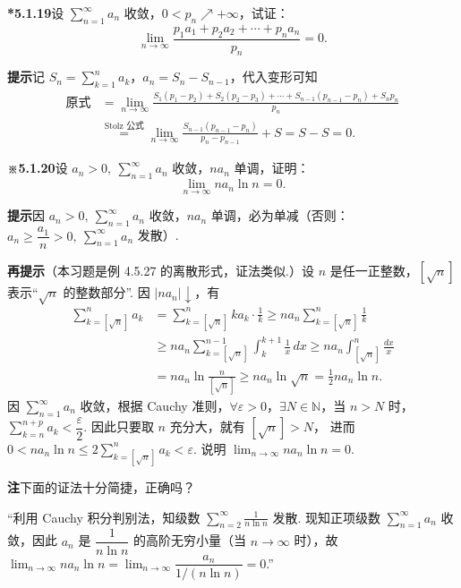 \documentclass[UTF8, 12pt, fontset=fandol, oneside]{ctexart}
\begin{document}
\noindent\textbf{*5.1.19}\quad 设 $\displaystyle\sum_{n=1}^{\infty}a_n$ 收敛，$0<p_n\nearrow+\infty$，试证：
\[
  \lim_{n\to\infty}\frac{p_1a_1+p_2a_2+\cdots+p_na_n}{p_n}=0.
\]

\noindent\textbf{提示}\quad 记 $S_n=\displaystyle\sum_{k=1}^n a_k$，$a_n=S_n-S_{n-1}$，代入变形可知
\[
\begin{aligned}
\text{原式}
&=\lim_{n\to\infty}
\frac{S_1(p_1-p_2)+S_2(p_2-p_3)+\cdots+S_{n-1}(p_{n-1}-p_n)+S_np_n}{p_n}\\
&\stackrel{\text{Stolz 公式}}{=}
\lim_{n\to\infty}\frac{S_{n-1}(p_{n-1}-p_n)}{p_n-p_{n-1}}+S
=S-S=0.
\end{aligned}
\]

\noindent\textbf{※5.1.20}\quad 设 $a_n>0,\ \displaystyle\sum_{n=1}^{\infty}a_n$ 收敛，$na_n$ 单调，证明：
\[
  \lim_{n\to\infty}na_n\ln n=0.
\]

\noindent\textbf{提示}\quad 因 $a_n>0,\ \sum_{n=1}^{\infty}a_n$ 收敛，$na_n$ 单调，必为单减（否则：
$a_n\ge\dfrac{a_1}{n}>0,\ \sum_{n=1}^{\infty}a_n$ 发散）.

\noindent\textbf{再提示}\quad （本习题是例 4.5.27 的离散形式，证法类似.）设 $n$ 是任一正整数，$[\sqrt n]$ 表示“$\sqrt n$ 的整数部分”. 因 $|na_n|\downarrow$，有
\[
\begin{aligned}
\sum_{k=[\sqrt n]}^n a_k
&=\sum_{k=[\sqrt n]}^n ka_k\cdot\frac1k
\ge na_n\sum_{k=[\sqrt n]}^n\frac1k\\
&\ge na_n\sum_{k=[\sqrt n]}^{n-1}\int_k^{k+1}\frac1x\,dx
\ge na_n\int_{[\sqrt n]}^n\frac{dx}{x}\\
&=na_n\ln\frac{n}{[\sqrt n]}
\ge na_n\ln\sqrt n=\frac12na_n\ln n.
\end{aligned}
\]
因 $\sum_{n=1}^{\infty}a_n$ 收敛，根据 Cauchy 准则，$\forall\varepsilon>0$，$\exists N\in\mathbb N$，当 $n>N$ 时，
$\displaystyle\sum_{k=n}^{n+p}a_k<\dfrac{\varepsilon}{2}$. 因此只要取 $n$ 充分大，就有 $[\sqrt n]>N$，
进而 $0<na_n\ln n\le2\displaystyle\sum_{k=[\sqrt n]}^na_k<\varepsilon$. 说明
$\lim_{n\to\infty}na_n\ln n=0$.

\noindent\textbf{注}\quad 下面的证法十分简捷，正确吗？

“利用 Cauchy 积分判别法，知级数
$\displaystyle\sum_{n=2}^{\infty}\frac1{n\ln n}$ 发散. 现知正项级数
$\displaystyle\sum_{n=1}^{\infty}a_n$ 收敛，因此 $a_n$ 是
$\dfrac1{n\ln n}$ 的高阶无穷小量（当 $n\to\infty$ 时），故
$\displaystyle\lim_{n\to\infty}na_n\ln n=\lim_{n\to\infty}\dfrac{a_n}{1/(n\ln n)}=0$.”
\end{document}
